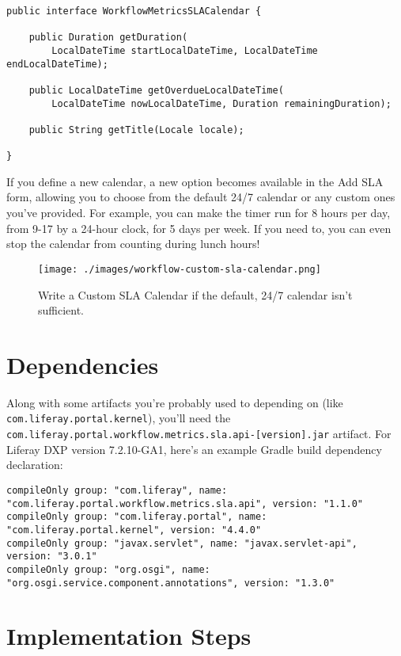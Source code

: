 \begin{verbatim}
public interface WorkflowMetricsSLACalendar {

    public Duration getDuration(
        LocalDateTime startLocalDateTime, LocalDateTime endLocalDateTime);

    public LocalDateTime getOverdueLocalDateTime(
        LocalDateTime nowLocalDateTime, Duration remainingDuration);

    public String getTitle(Locale locale);

}
\end{verbatim}

If you define a new calendar, a new option becomes available in the Add
SLA form, allowing you to choose from the default 24/7 calendar or any
custom ones you've provided. For example, you can make the timer run for
8 hours per day, from 9-17 by a 24-hour clock, for 5 days per week. If
you need to, you can even stop the calendar from counting during lunch
hours!

\begin{figure}
\centering
\texttt{[image: ./images/workflow-custom-sla-calendar.png]}
\caption{Write a Custom SLA Calendar if the default, 24/7 calendar isn't
sufficient.}
\end{figure}

\section{Dependencies}\label{dependencies-1}

Along with some artifacts you're probably used to depending on (like
\texttt{com.liferay.portal.kernel}), you'll need the
\texttt{com.liferay.portal.workflow.metrics.sla.api-{[}version{]}.jar}
artifact. For Liferay DXP version 7.2.10-GA1, here's an example Gradle
build dependency declaration:

\begin{verbatim}
compileOnly group: "com.liferay", name: "com.liferay.portal.workflow.metrics.sla.api", version: "1.1.0"
compileOnly group: "com.liferay.portal", name: "com.liferay.portal.kernel", version: "4.4.0"
compileOnly group: "javax.servlet", name: "javax.servlet-api", version: "3.0.1"
compileOnly group: "org.osgi", name: "org.osgi.service.component.annotations", version: "1.3.0"
\end{verbatim}

\section{Implementation Steps}\label{implementation-steps}

